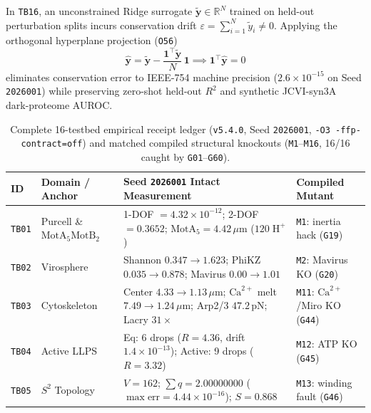 \documentclass[11pt,reqno]{amsart}
\begin{document}
In \texttt{TB16}, an unconstrained Ridge surrogate $\tilde{\mathbf{y}} \in \mathbb{R}^N$ trained on held-out perturbation splits incurs conservation drift $\varepsilon = \sum_{i=1}^N \tilde{y}_i \ne 0$. Applying the orthogonal hyperplane projection (\texttt{O56})
\begin{equation}
  \hat{\mathbf{y}} = \tilde{\mathbf{y}} - \frac{\mathbf{1}^\top \tilde{\mathbf{y}}}{N}\,\mathbf{1}
  \implies \mathbf{1}^\top \hat{\mathbf{y}} = 0
  \label{eq:o56}
\end{equation}
eliminates conservation error to IEEE-754 machine precision ($2.6\times 10^{-15}$ on Seed \texttt{2026001}) while preserving zero-shot held-out $R^2$ and synthetic JCVI-syn3A~\cite{breuer2019essential,thornburg2022fundamental} dark-proteome AUROC.

\begin{table}[t]
\centering
\caption{Complete 16-testbed empirical receipt ledger (\texttt{v5.4.0}, Seed \texttt{2026001}, \nolinkurl{-O3 -ffp-contract=off}) and matched compiled structural knockouts (\texttt{M1}--\texttt{M16}, 16/16 caught by \texttt{G01}--\texttt{G60}).}
\label{tab:tb16}
\scriptsize
\setlength{\tabcolsep}{3.5pt}
\renewcommand{\arraystretch}{0.94}
\begin{tabularx}{\textwidth}{@{}l l L l@{}}
\toprule
\textbf{ID} & \textbf{Domain / Anchor} & \textbf{Seed \texttt{2026001} Intact Measurement} & \textbf{Compiled Mutant} \\
\midrule
\texttt{TB01} & Purcell \& $\mathrm{MotA}_5\mathrm{MotB}_2$~\cite{purcell1977life,santiveri2020structure} & 1-DOF $=4.32\times 10^{-12}$; 2-DOF $=0.3652$; $\mathrm{MotA}_5=4.42\,\mu\mathrm{m}$ ($120\;\mathrm{H}^+$) & \texttt{M1}: inertia hack (\texttt{G19}) \\
\texttt{TB02} & Virosphere & Shannon $0.347\!\to\!1.623$; PhiKZ $0.035\!\to\!0.878$; Mavirus $0.00\!\to\!1.01$~\cite{fischer2016host} & \texttt{M2}: Mavirus KO (\texttt{G20}) \\
\texttt{TB03} & Cytoskeleton~\cite{dogterom1993physical,holy1997assembly} & Center $4.33\!\to\!1.13\,\mu\mathrm{m}$; $\mathrm{Ca}^{2+}$ melt $7.49\!\to\!1.24\,\mu\mathrm{m}$; Arp2/3 $47.2\,\mathrm{pN}$; Lacry $31\times$ & \texttt{M11}: $\mathrm{Ca}^{2+}$/Miro KO (\texttt{G44}) \\
\texttt{TB04} & Active LLPS~\cite{zwicker2015suppression} & Eq: 6 drops ($R=4.36$, drift $1.4\times 10^{-13}$); Active: 9 drops ($R=3.32$) & \texttt{M12}: ATP KO (\texttt{G45}) \\
\texttt{TB05} & $S^2$ Topology & $V=162$; $\sum q = 2.00000000$ ($\max\text{err}=4.44\times 10^{-16}$); $S=0.868$ & \texttt{M13}: winding fault (\texttt{G46}) \\

\end{tabularx}
\end{table}
\end{document}
